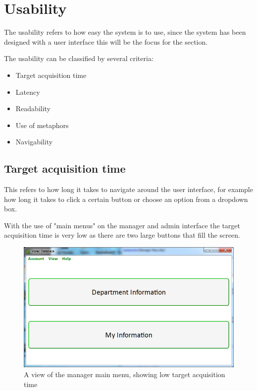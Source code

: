 \section{Usability}

The usability refers to how easy the system is to use, since the system has been designed with a user interface this will be the focus for the section. 

The usability can be classified by several criteria:
\begin{itemize}
\item{Target acquisition time}
\item{Latency}
\item{Readability}
\item{Use of metaphors}
\item{Navigability}
\end{itemize}

\subsection{Target acquisition time}

This refers to how long it takes to navigate around the user interface, for example how long it takes to click a certain button or choose an option from a dropdown box.

With the use of "main menus" on the manager and admin interface the target acquisition time is very low as there are two large buttons that fill the screen.

\begin{figure}[H]
    \includegraphics[width=\textwidth]{./Maintenance/Images/ManagerMM.png}
    \caption{A view of the manager main menu, showing low target acquisition time} 
\end{figure}

